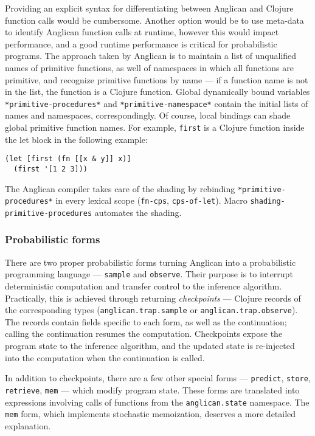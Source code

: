 \documentclass[preprint]{sigplanconf}
\begin{document}
Providing an explicit syntax for differentiating between
Anglican and Clojure function calls would be cumbersome. Another
option would be to use meta-data to identify Anglican function
calls at runtime, however this would impact performance, and
a good runtime performance is critical for probabilistic
programs. The approach taken by Anglican is to maintain a list
of unqualified names of primitive functions, as well of
namespaces in which all functions are primitive, and recognize
primitive functions by name --- if a function name is not in the
list, the function is a Clojure function. Global dynamically
bound variables \texttt{*primitive-procedures*} and
\texttt{*primitive-namespace*} contain the initial lists of
names and namespaces, correspondingly. Of course, local bindings
can shade global primitive function names. For example,
\texttt{first} is a Clojure function inside the let block in the
following example:
\begin{lstlisting}[style=default]
(let [first (fn [[x & y]] x)]
  (first '[1 2 3]))
\end{lstlisting}
The Anglican compiler takes care of the shading by rebinding
\texttt{*primitive-procedures*} in every lexical scope
(\texttt{fn-cps}, \texttt{cps-of-let}). Macro
\texttt{shading-primitive-procedures} automates the shading.

\subsubsection{Probabilistic forms}

There are two proper probabilistic forms turning Anglican into a
probabilistic programming language --- \texttt{sample} and
\texttt{observe}. Their purpose is to interrupt deterministic
computation and transfer control to the inference algorithm.
Practically, this is achieved through returning
\textit{checkpoints} --- Clojure records of the corresponding
types (\texttt{anglican.trap.sample} or
\texttt{anglican.trap.observe}). The records contain fields
specific to each form, as well as the continuation; calling the
continuation resumes the computation. Checkpoints expose the
program state to the inference algorithm, and the updated state
is re-injected into the computation when the continuation is
called. 

In addition to checkpoints, there are a few other special forms
--- \texttt{predict}, \texttt{store}, \texttt{retrieve},
\texttt{mem} --- which modify program state. These forms are
translated into expressions involving calls of functions from the
\texttt{anglican.state} namespace. The \texttt{mem} form, which
implements stochastic memoization, deserves a more detailed
explanation.
\end{document}
